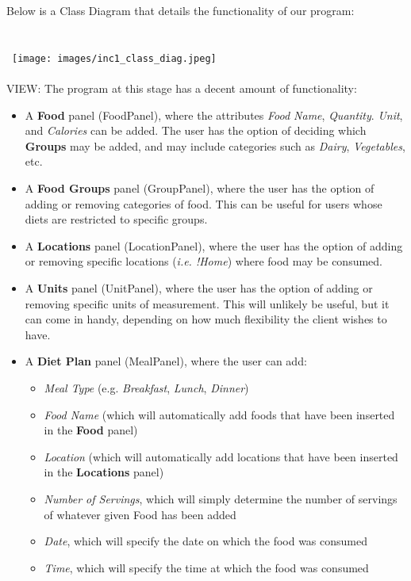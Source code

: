 \documentclass{article}
\begin{document}
Below is a Class Diagram that details the functionality of our program:
\\\\\\
\hbox{\hspace{+2.5em} \texttt{[image: images/inc1\_class\_diag.jpeg]}}
\\\\
VIEW: The program at this stage has a decent amount of functionality:
\\
\begin{itemize}
  \item A \textbf{Food} panel (FoodPanel), where the attributes \textit{Food Name}, \textit{Quantity}. \textit{Unit}, and \textit{Calories} can be added. The user has the option of deciding which \textbf{Groups} may be added, and may include categories such as \textit{Dairy}, \textit{Vegetables}, etc.
  \item A \textbf{Food Groups} panel (GroupPanel), where the user has the option of adding or removing categories of food. This can be useful for users whose diets are restricted to specific groups.
  \item A \textbf{Locations} panel (LocationPanel), where the user has the option of adding or removing specific locations (\textit{i.e. !Home}) where food may be consumed.
  \item A  \textbf{Units} panel (UnitPanel), where the user has the option of adding or removing specific units of measurement. This will unlikely be useful, but it can come in handy, depending on how much flexibility the client wishes to have.
  \item A \textbf{Diet Plan} panel (MealPanel), where the user can add:
    \begin{itemize}
        \item \textit{Meal Type} (e.g. \textit{Breakfast}, \textit{Lunch}, \textit{Dinner})
        \item \textit{Food Name} (which will automatically add foods that have been inserted in the \textbf{Food} panel)
        \item \textit{Location} (which will automatically add locations that have been inserted in the \textbf{Locations} panel)
        \item \textit{Number of Servings}, which will simply determine the number of servings of whatever given Food has been added
        \item \textit{Date}, which will specify the date on which the food was consumed
        \item \textit{Time}, which will specify the time at which the food was consumed

\end{itemize}
\end{itemize}
\end{document}
